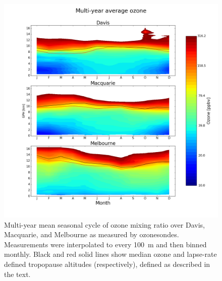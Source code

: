 \documentclass{article}
\begin{document}
    \begin{figure}[!htbp]
      \begin{center}
      \includegraphics[width=0.95\columnwidth]{figures/seasonaltropozone}
      \caption{
      Multi-year mean seasonal cycle of ozone mixing ratio over Davis, Macquarie, and Melbourne as measured by ozonesondes.
      Measurements were interpolated to every 100~m and then binned monthly.
      Black and red solid lines show median ozone and lapse-rate defined tropopause altitudes (respectively), defined as described in the text.
      }
      \label{fig:seasonaltropozone}
      \end{center}
    \end{figure}
\end{document}
